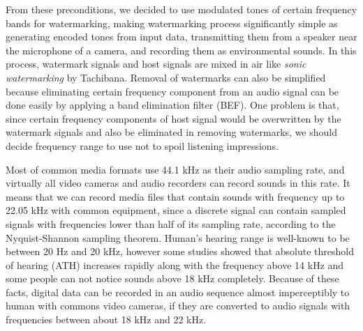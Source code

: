 From these preconditions, we decided to use modulated tones of certain frequency bands for watermarking, making watermarking process significantly simple as generating encoded tones from input data, transmitting them from a speaker near the microphone of a camera, and recording them as environmental sounds.
In this process, watermark signals and host signals are mixed in air like {\it sonic watermarking} by Tachibana. \cite{tachibana2003audio}
Removal of watermarks can also be simplified because eliminating certain frequency component from an audio signal can be done easily by applying a band elimination filter (BEF).
One problem is that, since certain frequency components of host signal would be overwritten by the watermark signals and also be eliminated in removing watermarks, we should decide frequency range to use not to spoil listening impressions.

Most of common media formats use 44.1 kHz as their audio sampling rate, and virtually all video cameras and audio recorders can record sounds in this rate. It means that we can record media files that contain sounds with frequency up to 22.05 kHz with common equipment, since a discrete signal can contain sampled signals with frequencies lower than half of its sampling rate, according to the Nyquist-Shannon sampling theorem. \cite{shannon1949communication}
Human's hearing range is well-known to be between 20 Hz and 20 kHz, however some studies showed that absolute threshold of hearing (ATH) increases rapidly along with the frequency above 14 kHz and some people can not notice sounds above 18 kHz completely. \cite{:/content/asa/journal/jasa/86/4/10.1121/1.398698, ashihara2006hearing}
Because of these facts, digital data can be recorded in an audio sequence almost imperceptibly to human with commons video cameras, if they are converted to audio signals with frequencies between about 18 kHz and 22 kHz.

